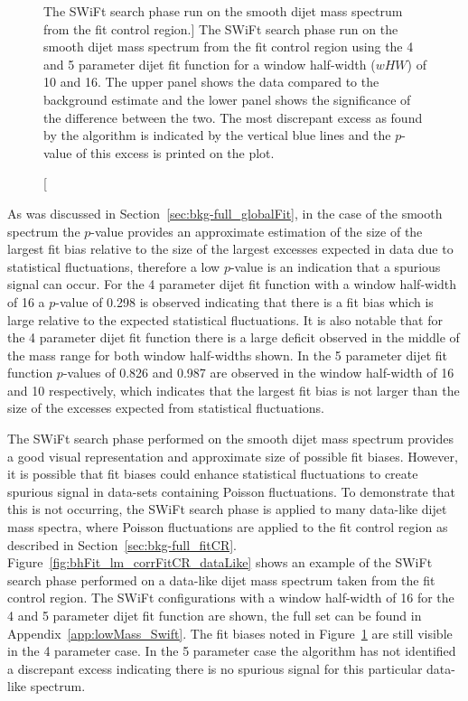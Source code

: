 \begin{figure}[!htb]
\caption
    [The SWiFt search phase run on the smooth dijet mass spectrum from the \lm{} fit control region.]
    {\label{fig:bhFit_lm_corrFitCR_smooth}
      The SWiFt search phase run on the smooth dijet mass spectrum from the \lm{} fit control region
      using the 4 and 5 parameter dijet fit function for a window half-width ($wHW$) of 10 and 16.
      The upper panel shows the data compared to the background estimate and the lower panel shows the significance of the difference between the two.
      The most discrepant excess as found by the \bh{} algorithm is indicated by the vertical blue lines and the \mbox{$p$-value} of this excess is printed on the plot. }
\vspace{-1em}
\end{figure}

As was discussed in Section~\ref{sec:bkg-full_globalFit}, in the case of the smooth spectrum the \bh{} \mbox{$p$-value} provides an approximate estimation
of the size of the largest fit bias relative to the size of the largest excesses expected in data due to statistical fluctuations,
therefore a low $p$-value is an indication that a spurious signal can occur. 
For the 4 parameter dijet fit function with a window half-width of 16 a \bh{} $p$-value of 0.298 is observed indicating that
there is a fit bias which is large relative to the expected statistical fluctuations.
It is also notable that for the 4 parameter dijet fit function there is a large deficit observed in the middle of the mass range for both window half-widths shown.
In the 5 parameter dijet fit function \bh{} $p$-values of 0.826 and 0.987 are observed in the window half-width of 16 and 10 respectively,
which indicates that the largest fit bias is not larger than the size of the excesses expected from statistical fluctuations.

The SWiFt search phase performed on the smooth dijet mass spectrum provides a good visual representation and approximate size of possible fit biases.
However, it is possible that fit biases could enhance statistical fluctuations to create spurious signal in data-sets containing Poisson fluctuations.
To demonstrate that this is not occurring, the SWiFt search phase is applied to many data-like dijet mass spectra,
where Poisson fluctuations are applied to the fit control region as described in Section~\ref{sec:bkg-full_fitCR}.
Figure~\ref{fig:bhFit_lm_corrFitCR_dataLike} shows an example of the SWiFt search phase performed on a data-like dijet mass spectrum taken from the fit control region.
The SWiFt configurations with a window half-width of 16 for the 4 and 5 parameter dijet fit function are shown, the full set can be found in Appendix~\ref{app:lowMass_Swift}.
The fit biases noted in Figure~\ref{fig:bhFit_lm_corrFitCR_smooth} are still visible in the 4 parameter case.
In the 5 parameter case the \bh{} algorithm has not identified a discrepant excess indicating
there is no spurious signal for this particular data-like spectrum.


